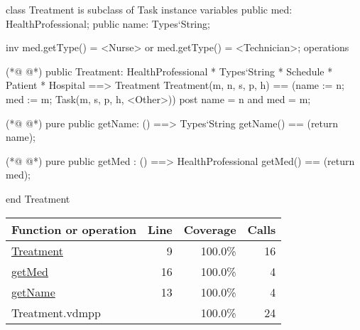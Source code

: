 \begin{vdmpp}[breaklines=true]
class Treatment is subclass of Task
instance variables
  public med: HealthProfessional;
  public name: Types`String;
  
  inv med.getType() = <Nurse> or med.getType() = <Technician>;
operations

(*@
\label{Treatment:9}
@*)
 public Treatment: HealthProfessional * Types`String * Schedule * Patient * Hospital ==> Treatment
  Treatment(m, n, s, p, h) == (name := n; med := m; Task(m, s, p, h, <Other>))
 post name = n and med = m;
 
(*@
\label{getName:13}
@*)
 pure public getName: () ==> Types`String
  getName() == (return name);
 
(*@
\label{getMed:16}
@*)
 pure public getMed : () ==> HealthProfessional
  getMed() == (return med);

end Treatment
\end{vdmpp}
\bigskip
\begin{longtable}{|l|r|r|r|}
\hline
Function or operation & Line & Coverage & Calls \\
\hline
\hline
\hyperref[Treatment:9]{Treatment} & 9&100.0\% & 16 \\
\hline
\hyperref[getMed:16]{getMed} & 16&100.0\% & 4 \\
\hline
\hyperref[getName:13]{getName} & 13&100.0\% & 4 \\
\hline
\hline
Treatment.vdmpp & & 100.0\% & 24 \\
\hline
\end{longtable}

